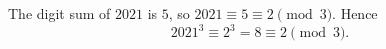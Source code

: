 The digit sum of $2021$ is $5$, so $2021\equiv5\equiv2\pmod3$. Hence
\[2021^3\equiv2^3=8\equiv\boxed{2}\pmod 3 .\]

